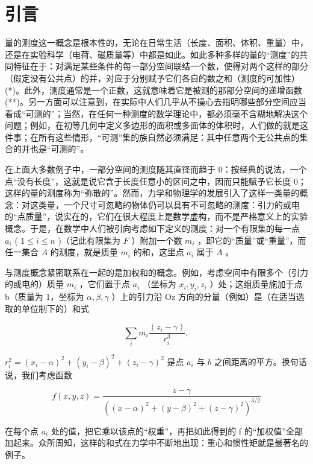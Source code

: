 \chapter*{引言}
{}

量的测度这一概念是根本性的，无论在日常生活（长度、面积、体积、重量）中，还是在实验科学（电荷、磁质量等）中都是如此。如此多种多样的量的“测度”的共同特征在于：对满足某些条件的每一部分空间联结一个数，使得对两个这样的部分（假定没有公共点）的并，对应于分别赋予它们各自的数之和（测度的可加性）(*)。此外，测度通常是一个正数，这就意味着它是被测的那部分空间的递增函数 (**)。另一方面可以注意到，在实际中人们几乎从不操心去指明哪些部分空间应当看成“可测的”；当然，在任何一种测度的数学理论中，都必须毫不含糊地解决这个问题；例如，在初等几何中定义多边形的面积或多面体的体积时，人们做的就是这件事；在所有这些情形，“可测”集的族自然必须满足：其中任意两个无公共点的集合的并也是“可测的”。

在上面大多数例子中，一部分空间的测度随其直径而趋于 0：按经典的说法，一个点“没有长度”，这就是说它含于长度任意小的区间之中，因而只能赋予它长度 0；这样的量的测度称为“弥散的”。然而，力学和物理学的发展引入了这样一类量的概念：对这类量，一个尺寸可忽略的物体仍可以具有不可忽略的测度：引力的或电的“点质量”，说实在的，它们在很大程度上是数学虚构，而不是严格意义上的实验概念。于是，在数学中人们被引向考虑如下定义的测度：对一个有限集的每一点 \(a_i\) ( \(1 \leqslant i \leqslant n\) )（记此有限集为 \(F\) ）附加一个数 \(m_i\) ，即它的“质量”或“重量”，而任一集合 \(A\) 的测度，就是质量 \(m_i\) 的和，这里点 \(a_i\) 属于 \(A\) 。

与测度概念紧密联系在一起的是加权和的概念。例如，考虑空间中有限多个（引力的或电的）质量 \(m_{i}\) ，它们置于点 \(a_{i}\) （坐标为 \(x_{i}, y_{i}, z_{i}\) ）处；这组质量施加于点 b（质量为 1，坐标为 \(\alpha, \beta, \gamma\) ）上的引力沿 Oz 方向的分量（例如）是（在适当选取的单位制下的）和式

\[
\sum_ {i} m _ {i} \frac {(z _ {i} - \gamma)}{r _ {i} ^ {3}},
\]

\(r_i^2 = (x_i - \alpha)^2 + (y_i - \beta)^2 + (z_i - \gamma)^2\) 是点 \(a_i\) 与 \(b\) 之间距离的平方。换句话说，我们考虑函数

\[
f (x, y, z) = \frac {z - \gamma}{\left((x - \alpha) ^ {2} + (y - \beta) ^ {2} + (z - \gamma) ^ {2}\right) ^ {3 / 2}}
\]

在每个点 \(a_{i}\) 处的值，把它乘以该点的“权重”，再把如此得到的 f 的“加权值”全部加起来。众所周知，这样的和式在力学中不断地出现：重心和惯性矩就是最著名的例子。

